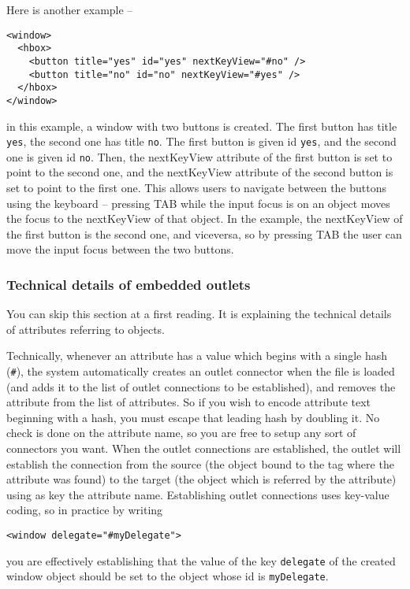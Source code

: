 Here is another example --
\begin{verbatim}
<window>
  <hbox>
    <button title="yes" id="yes" nextKeyView="#no" />
    <button title="no" id="no" nextKeyView="#yes" />
  </hbox>
</window>
\end{verbatim}
in this example, a window with two buttons is created.  The first
button has title \texttt{yes}, the second one has title \texttt{no}.
The first button is given id \texttt{yes}, and the second one is given
id \texttt{no}.  Then, the nextKeyView attribute of the first button
is set to point to the second one, and the nextKeyView attribute of
the second button is set to point to the first one.  This allows users
to navigate between the buttons using the keyboard -- pressing TAB
while the input focus is on an object moves the focus to the
nextKeyView of that object.  In the example, the nextKeyView of the
first button is the second one, and viceversa, so by pressing TAB the
user can move the input focus between the two buttons.

\subsubsection{Technical details of embedded outlets}
You can skip this section at a first reading.  It is explaining the
technical details of attributes referring to objects.

Technically, whenever an attribute has a value which begins with a
single hash (\texttt{\#}), the system automatically creates an outlet
connector when the file is loaded (and adds it to the list of outlet
connections to be established), and removes the attribute from the
list of attributes.  So if you wish to encode attribute text beginning
with a hash, you must escape that leading hash by doubling it.
No check is done on the attribute name, so you
are free to setup any sort of connectors you want.  When the outlet
connections are established, the outlet will establish the connection
from the source (the object bound to the tag where the attribute was
found) to the target (the object which is referred by the attribute)
using as key the attribute name.  Establishing outlet connections uses
key-value coding, so in practice by writing
\begin{verbatim}
<window delegate="#myDelegate">
\end{verbatim}
you are effectively establishing that the value of the key
\texttt{delegate} of the created window object should be set to the
object whose id is \texttt{myDelegate}.

